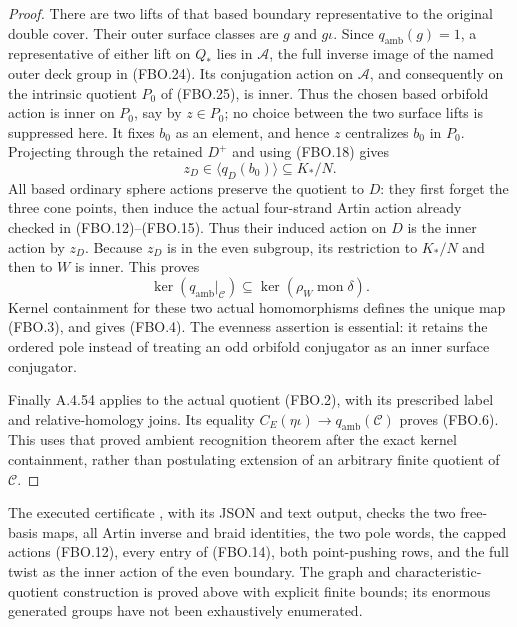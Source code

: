 \begin{proof}
There are two lifts of that based boundary representative to
the original double cover.  Their outer surface classes are
$g$ and $g\iota$.  Since $q_{\mathrm{amb}}(g)=1$, a representative
of either lift on $Q_*$ lies in $\mathcal A$, the full inverse
image of the named outer deck group in (FBO.24).
Its conjugation action on $\mathcal A$, and consequently on
the intrinsic quotient $P_0$ of (FBO.25), is inner.
Thus the chosen based orbifold action is inner on $P_0$,
say by $z\in P_0$; no choice between the two surface lifts
is suppressed here.
It fixes $b_0$ as an element, and hence $z$ centralizes $b_0$
in $P_0$.  Projecting through the retained $D^+$ and using
(FBO.18) gives
\[
                       z_D\in\langle q_D(b_0)\rangle
                                  \subseteq K_*/N.
                                                               \tag{FBO.26}
\]
All based ordinary sphere actions preserve the quotient to $D$:
they first forget the three cone points, then induce the actual
four-strand Artin action already checked in (FBO.12)--(FBO.15).
Thus their induced action on $D$ is the inner action by $z_D$.
Because $z_D$ is in the even subgroup, its restriction to
$K_*/N$ and then to $W$ is inner.  This proves
\[
 \ker(q_{\mathrm{amb}}|_{\mathcal C})
          \subseteq\ker(\rho_W\operatorname{mon}\delta).
                                                               \tag{FBO.27}
\]
Kernel containment for these two actual homomorphisms defines
the unique map (FBO.3), and gives (FBO.4).
The evenness assertion is essential: it retains the ordered
pole instead of treating an odd orbifold conjugator as an
inner surface conjugator.

Finally A.4.54 applies to the actual quotient (FBO.2), with
its prescribed label and relative-homology joins.  Its equality
$C_E(\eta\iota)\to q_{\mathrm{amb}}(\mathcal C)$ proves
(FBO.6).  This uses that proved ambient recognition theorem
after the exact kernel containment, rather than postulating
extension of an arbitrary finite quotient of $\mathcal C$.
\end{proof}

The executed certificate
, with
its JSON and text output, checks the two free-basis maps,
all Artin inverse and braid identities, the two pole words,
the capped actions (FBO.12), every entry of (FBO.14), both
point-pushing rows, and the full twist as the inner action
of the even boundary.  The graph and characteristic-quotient
construction is proved above with explicit finite bounds;
its enormous generated groups have not been exhaustively
enumerated.


